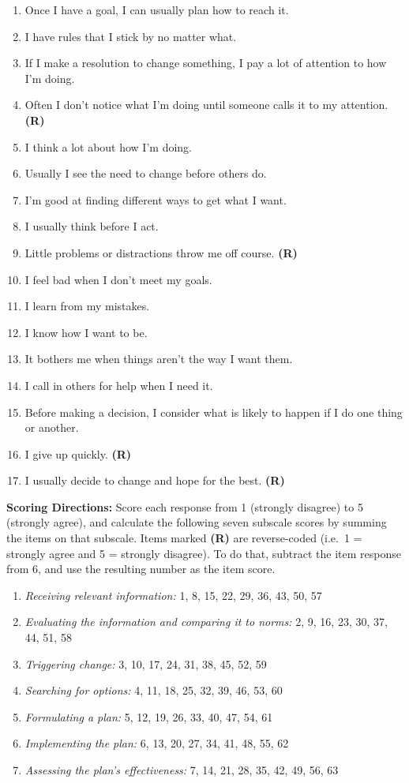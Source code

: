 \documentclass[letterpaper, nobind]{templates/ociamthesis}
\providecommand{\tightlist}{%
  \setlength{\itemsep}{0pt}\setlength{\parskip}{0pt}}
\begin{document}
\begin{enumerate}
\item
  Once I have a goal, I can usually plan how to reach it.
\item
  I have rules that I stick by no matter what.
\item
  If I make a resolution to change something, I pay a lot of attention to how I'm doing.
\item
  Often I don't notice what I'm doing until someone calls it to my attention. \textbf{(R)}
\item
  I think a lot about how I'm doing.
\item
  Usually I see the need to change before others do.
\item
  I'm good at finding different ways to get what I want.
\item
  I usually think before I act.
\item
  Little problems or distractions throw me off course. \textbf{(R)}
\item
  I feel bad when I don't meet my goals.
\item
  I learn from my mistakes.
\item
  I know how I want to be.
\item
  It bothers me when things aren't the way I want them.
\item
  I call in others for help when I need it.
\item
  Before making a decision, I consider what is likely to happen if I do one thing or another.
\item
  I give up quickly. \textbf{(R)}
\item
  I usually decide to change and hope for the best. \textbf{(R)}
\end{enumerate}

\textbf{Scoring Directions:}
Score each response from 1 (strongly disagree) to 5 (strongly agree), and calculate the following seven subscale scores by
summing the items on that subscale.
Items marked \textbf{(R)} are reverse-coded (i.e.~1 = strongly agree and 5 = strongly disagree).
To do that, subtract the item response from 6, and use the resulting number as the item score.

\begin{enumerate}
\def\labelenumi{\arabic{enumi}.}
\tightlist
\item
  \emph{Receiving relevant information:} 1, 8, 15, 22, 29, 36, 43, 50, 57
\item
  \emph{Evaluating the information and comparing it to norms:} 2, 9, 16, 23, 30, 37, 44, 51, 58
\item
  \emph{Triggering change:} 3, 10, 17, 24, 31, 38, 45, 52, 59
\item
  \emph{Searching for options:} 4, 11, 18, 25, 32, 39, 46, 53, 60
\item
  \emph{Formulating a plan:} 5, 12, 19, 26, 33, 40, 47, 54, 61
\item
  \emph{Implementing the plan:} 6, 13, 20, 27, 34, 41, 48, 55, 62
\item
  \emph{Assessing the plan's effectiveness:} 7, 14, 21, 28, 35, 42, 49, 56, 63
\end{enumerate}
\end{document}
